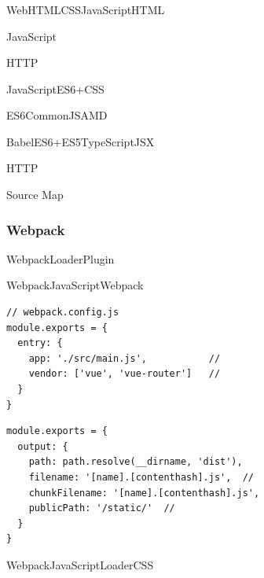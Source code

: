 \hypertarget{section-38}{%
\subsubsection{}\label{section-38}}

WebHTMLCSSJavaScriptHTML

\important{}JavaScript

\important{}HTTP

\important{}JavaScriptES6+CSS

\important{}

\important{}ES6CommonJSAMD

\important{}BabelES6+ES5TypeScriptJSX

\important{}HTTP

\important{}Source Map

\hypertarget{webpack}{%
\subsubsection{Webpack}\label{webpack}}

WebpackLoaderPlugin


WebpackJavaScriptWebpack

\begin{lstlisting}[style=javascript]
// webpack.config.js
module.exports = {
  entry: {
    app: './src/main.js',           // 
    vendor: ['vue', 'vue-router']   // 
  }
}
\end{lstlisting}


\begin{lstlisting}[style=javascript]
module.exports = {
  output: {
    path: path.resolve(__dirname, 'dist'),
    filename: '[name].[contenthash].js',  // 
    chunkFilename: '[name].[contenthash].js',
    publicPath: '/static/'  // 
  }
}
\end{lstlisting}

WebpackJavaScriptLoaderCSS

